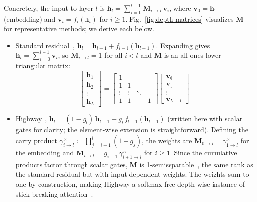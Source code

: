 Concretely, the input to layer $l$ is $\bm{h}_l = \sum_{i=0}^{l-1} \mathbf{M}_{i \to l}\, \bm{v}_i$, where $\bm{v}_0 = \bm{h}_1$ (embedding) and $\bm{v}_i = f_i(\bm{h}_i)$ for $i \geq 1$.
Fig.~\ref{fig:depth-matrices} visualizes $\mathbf{M}$ for representative methods; we derive each below.
\begin{itemize}[leftmargin=*]
    \item Standard residual~\cite{he2015resnet}, $\bm{h}_{l} = \bm{h}_{l-1} + f_{l-1}(\bm{h}_{l-1})$. Expanding gives $\bm{h}_l = \sum_{i=0}^{l-1} \bm{v}_i$, so $\mathbf{M}_{i \to l} = 1$ for all $i < l$ and $\mathbf{M}$ is an all-ones lower-triangular matrix:
          \[
              \begin{bmatrix}
                  \bm{h}_1 \\ \bm{h}_2 \\ \vdots \\ \bm{h}_L
              \end{bmatrix}
              =
              \begin{bmatrix}
                  1      &        &        &   \\
                  1      & 1      &        &   \\
                  \vdots & \vdots & \ddots &   \\
                  1      & 1      & \cdots & 1
              \end{bmatrix}
              \begin{bmatrix}
                  \bm{v}_0 \\ \bm{v}_1 \\ \vdots \\ \bm{v}_{L-1}
              \end{bmatrix}
          \]
    \item Highway~\cite{srivastava2015highway}, $\bm{h}_{l} = (1{-}g_{l})\,\bm{h}_{l-1} + g_{l}\,f_{l-1}(\bm{h}_{l-1})$ (written here with scalar gates for clarity; the element-wise extension is straightforward). Defining the carry product $\gamma_{i \to l}^{\times} \coloneqq \prod_{j=i+1}^{l}(1-g_j)$, the weights are $\mathbf{M}_{0 \to l} = \gamma_{1 \to l}^{\times}$ for the embedding and $\mathbf{M}_{i \to l} = g_{i+1}\,\gamma_{i+1 \to l}^{\times}$ for $i \geq 1$. Since the cumulative products factor through scalar gates, $\mathbf{M}$ is 1-semiseparable~\cite{mamba2}, the same rank as the standard residual but with input-dependent weights. The weights sum to one by construction, making Highway a softmax-free depth-wise instance of stick-breaking attention~\cite{tan2025stickbreaking}.

\end{itemize}
